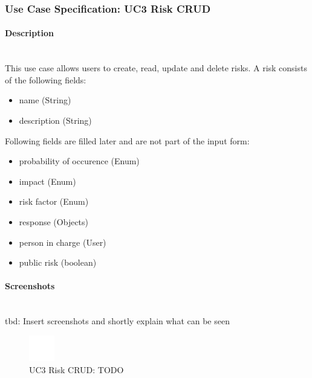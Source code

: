 
\newpage
\subsubsection{Use Case Specification: \ac{UC}3 Risk CRUD}
\label{sec:domainBbd}

\paragraph*{Description}\mbox{}\\
This use case allows users to create, read, update and delete risks. 
A risk consists of the following fields:
\begin{itemize}
	\vspace{-3mm}
	\setlength\itemsep{-1em}
	\item name (String)
	\item description (String)
\end{itemize}
Following fields are filled later and are not part of the input form:
\begin{itemize}
	\vspace{-3mm}
	\setlength\itemsep{-1em}
	\item probability of occurence (Enum)
	\item impact (Enum)
	\item risk factor (Enum)
	\item response (Objects)  
	\item person in charge (User)
	\item public risk (boolean)
\end{itemize}

\paragraph*{Screenshots}\mbox{}\\
tbd: Insert screenshots and shortly explain what can be seen
\begin{figure}[h] 
	\centering
	\includegraphics[width=0.1\textwidth]{Content/Domain/placeholder.png}
	\caption{\ac{UC}3 Risk CRUD: TODO}
	\label{fig:label3}
\end{figure}

